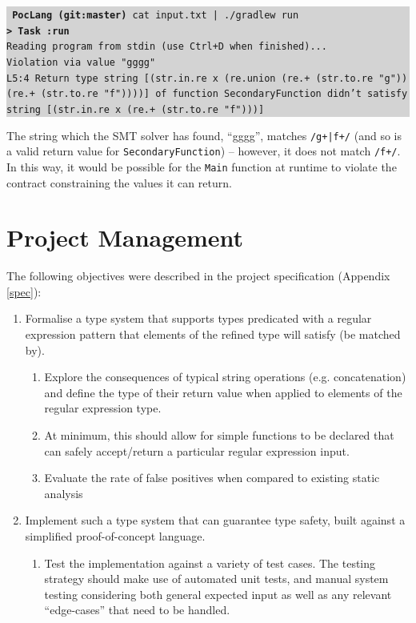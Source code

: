 \documentclass[a4paper]{article}
\newcommand{\termbox}[1] {\colorbox{lightgrey}{\parbox{\textwidth}{\vspace{.75\baselineskip}\centering\parbox{0.95\textwidth}{ \sffamily#1\vspace{.75\baselineskip}}}}}
\begin{document}
\termbox{
    \texttt{\textcolor{term-green}{} \ttfamily \textbf{\textcolor{term-dir}{PocLang} \textcolor{term-git}{(git:}\textcolor{term-branch}{master}\textcolor{term-git}{)}} cat input.txt | ./gradlew run}\\
    \texttt{\textbf{> Task :run}}\\
    \textcolor{term-green}{\texttt{Reading program from stdin (use Ctrl+D when finished)...}}\\
    \textcolor{id7-ruby-red}{\texttt{Violation via value "gggg"}}\\
    \textcolor{id7-ruby-red}{\texttt{L5:4 Return type string [(str.in.re x (re.union (re.+ (str.to.re "g")) (re.+ (str.to.re "f"))))] of function SecondaryFunction didn't satisfy string [(str.in.re x (re.+ (str.to.re "f")))]}}
}

The string which the SMT solver has found, ``gggg'', matches \texttt{/g+|f+/} (and so is a valid return value for \texttt{SecondaryFunction}) -- however, it does not match \texttt{/f+/}. In this way, it would be possible for the \texttt{Main} function at runtime to violate the contract constraining the values it can return.

\section{Project Management}

The following objectives were described in the project specification (Appendix \ref{spec}):

\begin{enumerate}
    \item Formalise a type system that supports types predicated with a regular expression pattern that elements of the refined type will satisfy (be matched by).
    \begin{enumerate}
        \item Explore the consequences of typical string operations (e.g. concatenation) and define the type of
        their return value when applied to elements of the regular expression type.

        \item At minimum, this should allow for simple functions to be declared that can safely accept/return a
        particular regular expression input.
        \item Evaluate the rate of false positives when compared to existing static analysis
    \end{enumerate}
    \item Implement such a type system that can guarantee type safety, built against a simplified proof-of-concept
    language.
    \begin{enumerate}
        \item Test the implementation against a variety of test cases. The testing strategy should make use of
        automated unit tests, and manual system testing considering both general expected input as well as
        any relevant ``edge-cases'' that need to be handled.
    \end{enumerate}
\end{enumerate}
\end{document}
